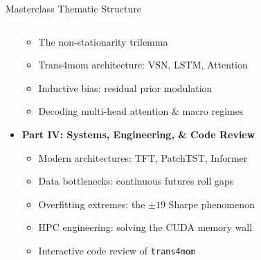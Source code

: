 \documentclass[10pt]{beamer}
\begin{document}
\begin{frame}{Masterclass Thematic Structure}
\begin{columns}[t]
\begin{column}{0.48\textwidth}
\begin{itemize}
        \begin{itemize}\tiny
          \item The non-stationarity trilemma
          \item Trans4mom architecture: VSN, LSTM, Attention
          \item Inductive bias: residual prior modulation
          \item Decoding multi-head attention \& macro regimes
        \end{itemize}
        \item \textbf{Part IV: Systems, Engineering, \& Code Review}
        \begin{itemize}\tiny
          \item Modern architectures: TFT, PatchTST, Informer
          \item Data bottlenecks: continuous futures roll gaps
          \item Overfitting extremes: the $\pm 19$ Sharpe phenomenon
          \item HPC engineering: solving the CUDA memory wall
          \item Interactive code review of \texttt{trans4mom}
        \end{itemize}
      \end{itemize}
    \end{column}
  \end{columns}
\end{frame}
\end{document}
